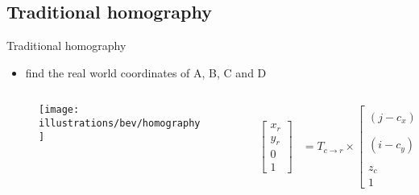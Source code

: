 \documentclass[aspectratio=169,hyperref={pdfpagelabels=false}]{beamer}
\begin{document}
    \subsection{Traditional homography}

    \begin{frame}{Traditional homography}
        \begin{itemize}
            \item find the real world coordinates of A, B, C and D
        \end{itemize}
        \begin{columns}%
            \begin{column}{.5\textwidth}
                \begin{figure}
                    \centering
                    \texttt{[image: illustrations/bev/homography]}
                \end{figure}
            \end{column}%
            \pause
            \begin{column}{.5\textwidth}
                \begin{align}
                    \label{eq:homography:complete}
                    \begin{bmatrix}
                        x_r \\
                        y_r \\
                        0   \\
                        1
                    \end{bmatrix} &= T_{c\rightarrow r} \times
                    \begin{bmatrix}
                    (j - c_x)
                        \dfrac{z_c}{f_x}\\
                        (i - c_y) \dfrac{z_c}{f_y} \\
                        z_c                        \\
                        1
                    \end{bmatrix}
                \end{align}
            \end{column}%
        \end{columns}
    \end{frame}
\end{document}
